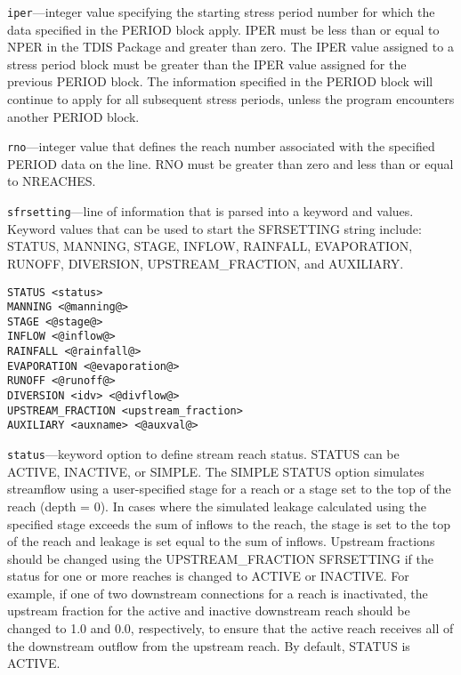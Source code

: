 \begin{description}
\item \texttt{iper}---integer value specifying the starting stress period number for which the data specified in the PERIOD block apply.  IPER must be less than or equal to NPER in the TDIS Package and greater than zero.  The IPER value assigned to a stress period block must be greater than the IPER value assigned for the previous PERIOD block.  The information specified in the PERIOD block will continue to apply for all subsequent stress periods, unless the program encounters another PERIOD block.

\item \texttt{rno}---integer value that defines the reach number associated with the specified PERIOD data on the line. RNO must be greater than zero and less than or equal to NREACHES.

\item \texttt{sfrsetting}---line of information that is parsed into a keyword and values.  Keyword values that can be used to start the SFRSETTING string include: STATUS, MANNING, STAGE, INFLOW, RAINFALL, EVAPORATION, RUNOFF, DIVERSION, UPSTREAM\_FRACTION, and AUXILIARY.

\begin{lstlisting}[style=blockdefinition]
STATUS <status>
MANNING <@manning@>
STAGE <@stage@>
INFLOW <@inflow@>
RAINFALL <@rainfall@>
EVAPORATION <@evaporation@>
RUNOFF <@runoff@>
DIVERSION <idv> <@divflow@> 
UPSTREAM_FRACTION <upstream_fraction>
AUXILIARY <auxname> <@auxval@> 
\end{lstlisting}

\item \texttt{status}---keyword option to define stream reach status.  STATUS can be ACTIVE, INACTIVE, or SIMPLE. The SIMPLE STATUS option simulates streamflow using a user-specified stage for a reach or a stage set to the top of the reach (depth = 0). In cases where the simulated leakage calculated using the specified stage exceeds the sum of inflows to the reach, the stage is set to the top of the reach and leakage is set equal to the sum of inflows. Upstream fractions should be changed using the UPSTREAM\_FRACTION SFRSETTING if the status for one or more reaches is changed to ACTIVE or INACTIVE. For example, if one of two downstream connections for a reach is inactivated, the upstream fraction for the active and inactive downstream reach should be changed to 1.0 and 0.0, respectively, to ensure that the active reach receives all of the downstream outflow from the upstream reach. By default, STATUS is ACTIVE.


\end{description}
